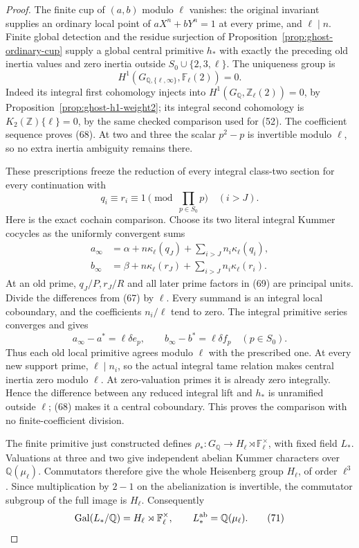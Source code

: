 \begin{proof}
The finite cup of \((a,b)\) modulo \(\ell\)
vanishes: the original invariant supplies an
ordinary local point of \(aX^n+bY^n=1\) at every
prime, and \(\ell\mid n\). Finite global detection
and the residue surjection of
Proposition~\ref{prop:ghost-ordinary-cup} supply
a global central primitive \(h_*\) with exactly
the preceding old inertia values and zero inertia
outside \(S_0\cup\{2,3,\ell\}\).
The uniqueness group is
\[
 H^1(G_{\mathbb Q,\{\ell,\infty\}},
                      \mathbb F_\ell(2))=0.          \tag{68}
\]
Indeed its integral first cohomology injects into
\(H^1(G_{\mathbb Q},\mathbb Z_\ell(2))=0\),
by Proposition~\ref{prop:ghost-h1-weight2}; its
integral second cohomology is
\(K_2(\mathbb Z)\{\ell\}=0\), by the same
checked comparison used for (52). The coefficient
sequence proves (68). At two and three the scalar
\(p^2-p\) is invertible modulo \(\ell\), so no
extra inertia ambiguity remains there.

These prescriptions freeze the reduction of every
integral class-two section for every continuation
with
\[
 q_i\equiv r_i\equiv1\pmod{\prod_{p\in S_0}p}
                            \quad(i>J).              \tag{69}
\]
Here is the exact cochain comparison. Choose its
two literal integral Kummer cocycles as the
uniformly convergent sums
\[
 \begin{split}
 a_\infty&=\alpha+n\kappa_\ell(q_J)
                         +\sum_{i>J}n_i\kappa_\ell(q_i),\\
 b_\infty&=\beta+n\kappa_\ell(r_J)
                         +\sum_{i>J}n_i\kappa_\ell(r_i).
 \end{split}
\]
At an old prime, \(q_J/P,r_J/R\) and all later
prime factors in (69) are principal units. Divide
the differences from (67) by \(\ell\). Every
summand is an integral local coboundary, and the
coefficients \(n_i/\ell\) tend to zero.
The integral primitive series converges and gives
\[
 a_\infty-a^*=\ell\delta e_p,
 \qquad b_\infty-b^*=\ell\delta f_p
                       \quad(p\in S_0).              \tag{70}
\]
Thus each old local primitive agrees modulo
\(\ell\) with the prescribed one. At every new
support prime, \(\ell\mid n_i\), so the actual
integral tame relation makes central inertia zero
modulo \(\ell\). At zero-valuation primes it is
already zero integrally. Hence the difference
between any reduced integral lift and \(h_*\)
is unramified outside \(\ell\); (68) makes it
a central coboundary. This proves the comparison
with no finite-coefficient division.

The finite primitive just constructed defines
\(\rho_*:G_{\mathbb Q}\to
H_\ell\rtimes\mathbb F_\ell^\times\), with fixed
field \(L_*\). Valuations at three and two give
independent abelian Kummer characters over
\(\mathbb Q(\mu_\ell)\). Commutators therefore
give the whole Heisenberg group \(H_\ell\), of
order \(\ell^3\). Since multiplication by
\(2-1\) on the abelianization is invertible,
the commutator subgroup of the full image is
\(H_\ell\). Consequently
\[
 \operatorname{Gal}(L_*/\mathbb Q)
       =H_\ell\rtimes\mathbb F_\ell^\times,
       \qquad L_*^{\rm ab}=\mathbb Q(\mu_\ell).
                                                        \tag{71}
\]


\end{proof}
